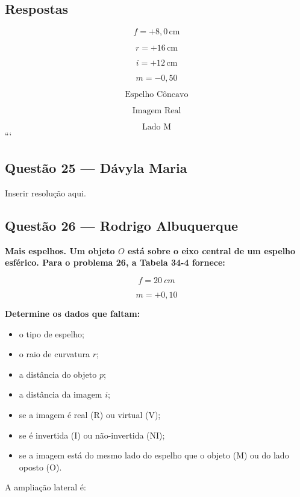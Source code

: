 \documentclass[12pt,a4paper]{article}
\begin{document}

\subsection*{Respostas}

\[
\boxed{
f = +8,0\,\text{cm}
}
\]

\[
\boxed{
r = +16\,\text{cm}
}
\]

\[
\boxed{
i = +12\,\text{cm}
}
\]

\[
\boxed{
m = -0,50
}
\]

\[
\boxed{
\text{Espelho Côncavo}
}
\]

\[
\boxed{
\text{Imagem Real}
}
\]

\[
\boxed{
\text{Lado M}
}
\]
```


\subsection{Questão 25 — Dávyla Maria}
Inserir resolução aqui.

\subsection{Questão 26 — Rodrigo Albuquerque}
\textbf{Mais espelhos. Um objeto \(O\) está sobre o eixo central de um espelho esférico. Para o problema 26, a Tabela 34-4 fornece:}

\[
f=20\ cm
\]

\[
m=+0,10
\]

\textbf{Determine os dados que faltam:}

\begin{itemize}
\item[(a)] o tipo de espelho;
\item[(c)] o raio de curvatura \(r\);
\item[(d)] a distância do objeto \(p\);
\item[(e)] a distância da imagem \(i\);
\item[(g)] se a imagem é real (R) ou virtual (V);
\item[(h)] se é invertida (I) ou não-invertida (NI);
\item[(i)] se a imagem está do mesmo lado do espelho que o objeto (M) ou do lado oposto (O).
\end{itemize}

\vspace{0.5cm}

A ampliação lateral é:
\end{document}
